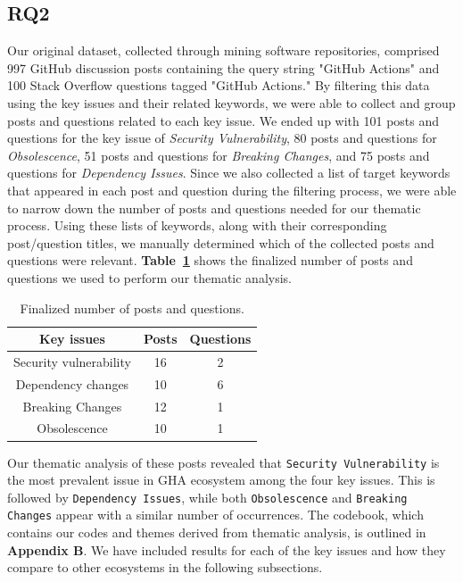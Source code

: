 \documentclass[conference]{IEEEtran}
\begin{document}
  \subsection{RQ2}
Our original dataset, collected through mining software repositories, comprised 997 GitHub discussion posts containing the query string "GitHub Actions" and 100 Stack Overflow questions tagged "GitHub Actions." By filtering this data using the key issues and their related keywords, we were able to collect and group posts and questions related to each key issue. We ended up with 101 posts and questions for the key issue of \textit{Security Vulnerability}, 80 posts and questions for \textit{Obsolescence}, 51 posts and questions for \textit{Breaking Changes}, and 75 posts and questions for \textit{Dependency Issues}. Since we also collected a list of target keywords that appeared in each post and question during the filtering process, we were able to narrow down the number of posts and questions needed for our thematic process. Using these lists of keywords, along with their corresponding post/question titles, we manually determined which of the collected posts and questions were relevant. \textbf{Table~\ref{tab:number_data}} shows the finalized number of posts and questions we used to perform our thematic analysis.
\begin{table}[!h]
\centering
\caption{Finalized number of posts and questions.}
\label{tab:number_data}
\begin{tabular}{|c|c|c|}
  \hline
  \textbf{Key issues} & \textbf{Posts}  & \textbf{Questions} \\
  \hline
  \hline
    Security vulnerability & 16 &  2  \\
  \hline
  \hline
   Dependency changes & 10 & 6  \\
  \hline
  \hline
   Breaking Changes & 12 & 1 \\
  \hline
  \hline
   Obsolescence & 10  & 1 \\
  \hline
\end{tabular}
\end{table}

Our thematic analysis of these posts revealed that \texttt{Security Vulnerability} is the most prevalent issue in GHA ecosystem among the four key issues. This is followed by \texttt{Dependency Issues}, while both \texttt{Obsolescence} and \texttt{Breaking Changes} appear with a similar number of occurrences. The codebook, which contains our codes and themes derived from thematic analysis, is outlined in \textbf{Appendix B}. We have included results for each of the key issues and how they compare to other ecosystems in the following subsections.
\end{document}
